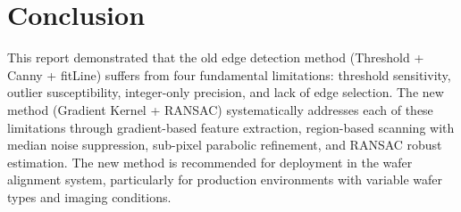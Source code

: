 \documentclass[12pt, a4paper]{article}
\begin{document}
\section{Conclusion}

This report demonstrated that the old edge detection method (Threshold + Canny + fitLine) suffers from four fundamental limitations: threshold sensitivity, outlier susceptibility, integer-only precision, and lack of edge selection. The new method (Gradient Kernel + RANSAC) systematically addresses each of these limitations through gradient-based feature extraction, region-based scanning with median noise suppression, sub-pixel parabolic refinement, and RANSAC robust estimation. The new method is recommended for deployment in the wafer alignment system, particularly for production environments with variable wafer types and imaging conditions.
\end{document}
